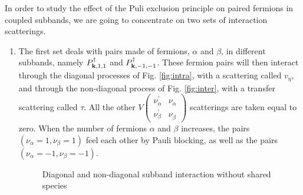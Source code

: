 \documentclass[11pt]{article} %
\begin{document}
In order to study the effect of the Puli exclusion principle on paired fermions in coupled subbands, we are going to concentrate on two sets of interaction scatterings.  
\begin{enumerate}
\item The first set deals with pairs made of fermions, $\alpha$ and $\beta$, in different subbands, namely $P^{\dagger}_{\mathbf{k},1,1}$ and $P^{\dagger}_{\mathbf{k},-1,-1}$. These fermion pairs will then interact through the diagonal processes of Fig. \ref{fig:intra}, with a scattering called $v_{\eta}$, and through the non-diagonal process of Fig. \ref{fig:inter}, with a transfer scattering called $\tau$.  All the other $V 
\left(\begin{smallmatrix}\nu_{\alpha}^{'}&\nu_{\alpha}^{}\\ \nu_{\beta}^{'}&\nu_{\beta}^{}\end{smallmatrix}\right)$ scatterings are taken equal to zero.  When the number of fermions $\alpha$ and $\beta$ increases, the pairs $(\nu_{\alpha}=1, \nu_{\beta}=1)$ feel each other by Pauli blocking, as well as the pairs $(\nu_{\alpha}=-1, \nu_{\beta}=-1)$.
\begin{figure}[hhtb]
	\centering
	         \quad
	\caption{Diagonal and non-diagonal subband interaction without shared species}

\end{figure}
\end{enumerate}
\end{document}
